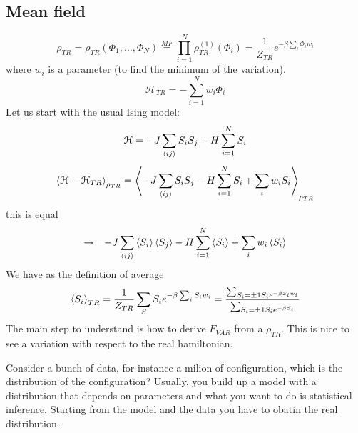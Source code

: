 \documentclass[../main/main.tex]{subfiles}
\begin{document}
\subsection{Mean field}
\begin{equation}
  \rho _{TR} = \rho _{TR} ( \Phi _1, \dots, \Phi _N) \overset{MF}{=} \prod_{i=1}^{N} \rho _{TR}^{(1)} ( \Phi _i) = \frac{1}{Z_{TR}} e^{-\beta \sum_{i}^{}  \Phi _i w_i}
\end{equation}
where \( w_i \) is a parameter (to find the minimum of the variation).
\begin{equation}
  \mathcal{H}_{TR} = - \sum_{i=1}^{N} w_i \Phi _i
\end{equation}
Let us start with the usual Ising model:
\begin{equation}
  \mathcal{H} = - J \sum_{\expval{ij} }^{} S_i S_j - H \sum_{i=1}^{N} S_i
\end{equation}
\begin{equation}
  \expval{\mathcal{H}- \mathcal{H}_{TR}}_{\rho _{TR}}  = \expval{- J \sum_{\expval{ij} }^{} S_i S_j - H \sum_{i=1}^{N} S_i  + \sum_{i}^{} w_i S_i }_{\rho _{TR}}
\end{equation}
this is equal
\begin{equation}
  \rightarrow = -J \sum_{\expval{ij} }^{}  \expval{S_i}  \expval{S_j} - H \sum_{i=1}^{N}   \expval{S_i} + \sum_{i}^{} w_i \expval{S_i}
\end{equation}
We have as the definition of average
\begin{equation}
  \expval{S_i}_{TR} = \frac{1}{Z_{TR}} \sum_{S}^{} S_i e^{-\beta \sum_{i}^{} S _i w_i }
  = \frac{\sum_{S_i = \pm 1 S_i e^{-\beta S_i w_i } }^{}  }{\sum_{S_i = \pm 1 S_i e^{-\beta S_i } }^{} }
\end{equation}
The main step to understand is how to derive \( F_{VAR} \) from a \( \rho _{TR} \).
This is nice to see a variation with respect to the real hamiltonian.

Consider a bunch of data, for instance a milion of configuration, which is the distribution of the configuration? Usually, you build up a model with a distribution that depends on parameters and what you want to do is statistical inference. Starting from the model and the data you have to obatin the real distribution.
\end{document}
